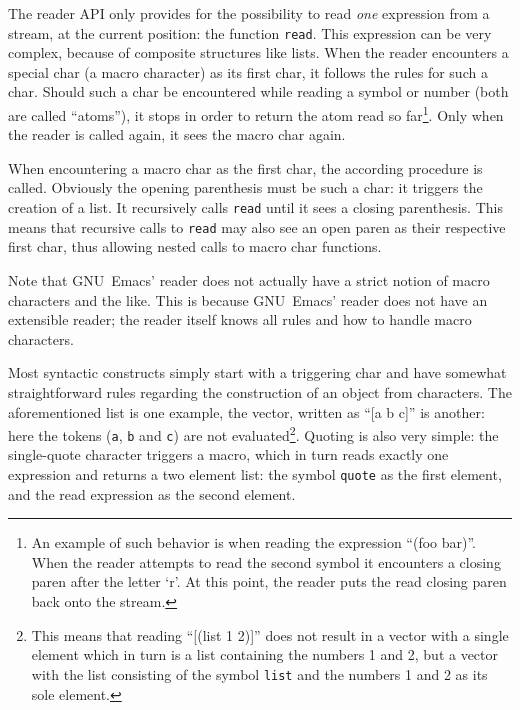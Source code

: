 \documentclass[a4paper,10pt,twoside]{report}
\newcommand{\sym}[1]{\texttt{#1}}
\newcommand{\fun}[1]{\texttt{#1}}
\newcommand{\emacs}{GNU~Emacs}
\newcommand{\Read}{\fun{read}}
\begin{document}

The reader API only provides for the possibility to read \emph{one} expression
from a stream, at the current position: the function \Read{}.  This
expression can be very complex, because of composite structures like lists.
When the reader encounters a special char (a macro character) as its first char,
it follows the rules for such a char.  Should such a char be encountered while
reading a symbol or number (both are called ``atoms''), it stops in order to
return the atom read so far\footnote{An example of such behavior is when
  reading the expression ``(foo bar)''.  When the reader attempts to read the
  second symbol it encounters a closing paren after the letter `r'.  At this
  point, the reader puts the read closing paren back onto the stream.}.  Only
when the reader is called again, it sees the macro char again.

When encountering a macro char as the first char, the according procedure is
called.  Obviously the opening parenthesis must be such a char: it triggers the
creation of a list.  It recursively calls \Read{} until it sees a closing
parenthesis.  This means that recursive calls to \Read{} may also see an open
paren as their respective first char, thus allowing nested calls to macro char
functions.

Note that \emacs{}’ reader does not actually have a strict notion of macro
characters and the like.  This is because \emacs{}’ reader does not have an
extensible reader; the reader itself knows all rules and how to handle macro
characters.

Most syntactic constructs simply start with a triggering char and have somewhat
straightforward rules regarding the construction of an object from characters.
The aforementioned list is one example, the vector, written as ``[a b c]'' is
another: here the tokens (\sym{a}, \sym{b} and \sym{c}) are not
evaluated\footnote{This means that reading ``[(list 1 2)]'' does not result in a
  vector with a single element which in turn is a list containing the numbers 1
  and 2, but a vector with the list consisting of the symbol \sym{list} and the
  numbers 1 and 2 as its sole element.}.  Quoting is also very simple: the
single-quote character triggers a macro, which in turn reads exactly one
expression and returns a two element list: the symbol \sym{quote} as the first
element, and the read expression as the second element.
\end{document}
